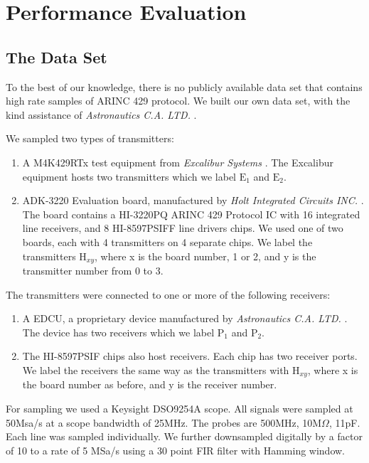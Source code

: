 \documentclass[conference]{IEEEtran}
\begin{document}
 
\section{Performance Evaluation}

\subsection{The Data Set} \label{TheDataSet}
  To the best of our knowledge, there is no publicly available data set that contains high rate samples of ARINC 429 protocol. We built our own data set, with the kind assistance of \textit{Astronautics C.A. LTD.} \cite{astronautics2019home}.
  
  We sampled two types of transmitters:
  \begin{enumerate}
     \item A M4K429RTx test equipment from \textit{Excalibur Systems} \cite{excalibur2019m4k429rtx}. The Excalibur equipment hosts two transmitters which we label \(\text{E}_1\) and \(\text{E}_2\).
     \item ADK-3220 Evaluation board, manufactured by \textit{Holt Integrated Circuits INC.} \cite{holt2019evaluation}. The board contains a HI-3220PQ ARINC 429 Protocol IC with 16 integrated line receivers, and 8 HI-8597PSIFF line drivers chips. We used one of two boards, each with 4 transmitters on 4 separate chips. We label the transmitters \(\text{H}_{xy}\), where x is the board number, 1 or 2, and y is the transmitter number from 0 to 3.
  \end{enumerate}
  
  The transmitters were connected to one or more of the following receivers:
  \begin{enumerate}
    \item A EDCU, a proprietary device manufactured by \textit{Astronautics C.A. LTD.} \cite{astronautics2019edcu}. The device has two receivers which we label \(\text{P}_1\) and \(\text{P}_2\).
    \item The HI-8597PSIF chips also host receivers. Each chip has two receiver ports. We label the receivers the same way as the transmitters with \(\text{H}_{xy}\), where x is the board number as before, and y is the receiver number.
  \end{enumerate}
  
  For sampling we used a Keysight DSO9254A scope. All signals were sampled at 50Msa/s at a scope bandwidth of 25MHz. The probes are 500MHz, 10M\(\Omega\), 11pF. Each line was sampled individually. We further downsampled digitally by a factor of 10 to a rate of 5 MSa/s using a 30 point FIR filter with Hamming window.
  
\end{document}
